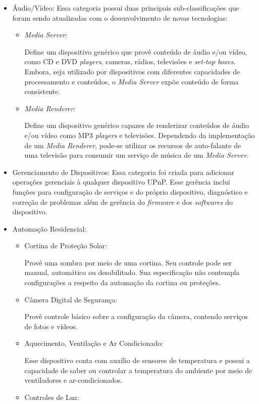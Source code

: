\begin{itemize}
\item Áudio/Vídeo:
	Essa categoria possui duas principais sub-classificações que foram sendo atualizadas com o desenvolvimento de novas tecnologias: 
	\begin{itemize}
		\item \emph{Media Server}:

			Define um dispositivo genérico que provê conteúdo de áudio e/ou vídeo, como CD e DVD \emph{players}, cameras, rádios, televisões e \emph{set-top boxes}. Embora, seja utilizado por dispositivos com diferentes capacidades de processamento e conteúdos, o \emph{Media Server} expõe conteúdo de forma consistente.

		\item \emph{Media Renderer}:

			Define um dispositivo genérico capazes de renderizar conteúdos de áudio e/ou vídeo como MP3 \emph{players} e televisões. Dependendo da implementação de um \emph{Media Renderer}, pode-se utilizar os recursos de auto-falante de uma televisão para consumir um serviço de música de um \emph{Media Server}.
	\end{itemize}
\item Gerenciamento de Dispositivos:
	Essa categoria foi criada para adicionar operações gerenciais à qualquer dispositivo UPnP. Esse gerência inclui funções para configuração de serviços e do próprio dispositivo, diagnóstico e correção de problemas além de gerência do \emph{firmware} e dos \emph{softwares} do dispositivo.

\item Automação Residencial:
	\begin{itemize}
		\item Cortina de Proteção Solar:

			Provê uma sombra por meio de uma cortina. Seu controle pode ser manual, automático ou desabilitado. Sua especificação não contempla configurações a respeito da automação da cortina ou proteções.
		\item Câmera Digital de Segurança:

			Provê controle básico sobre a configuração da câmera, contendo serviços de fotos e vídeos.
		\item Aquecimento, Ventilação e Ar Condicionado:
			
			Esse dispositivo conta com auxílio de sensores de temperatura e possui a capacidade de saber ou controlar a temperatura do ambiente por meio de ventiladores e ar-condicionados.
		\item Controles de Luz:
			

\end{itemize}
\end{itemize}
